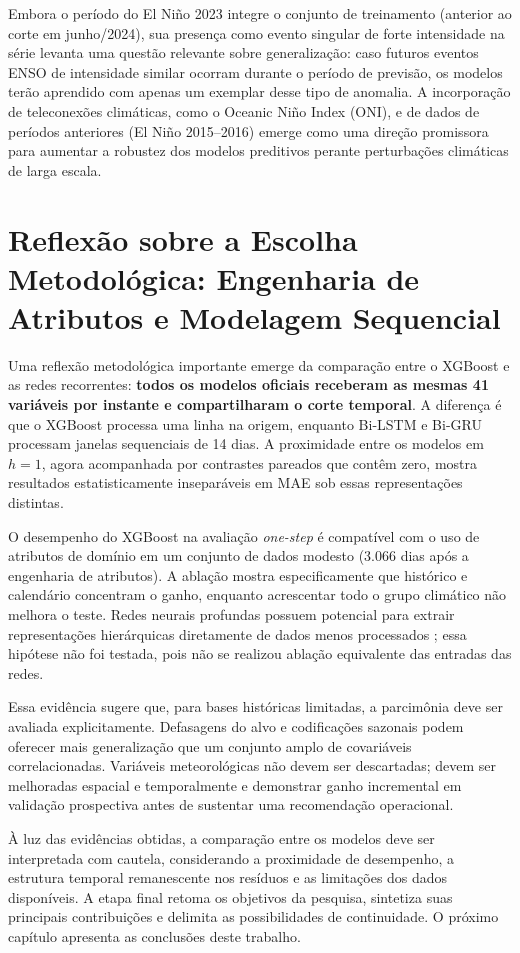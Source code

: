 Embora o período do El Niño 2023 integre o conjunto de treinamento (anterior ao corte em junho/2024), sua presença como evento singular de forte intensidade na série levanta uma questão relevante sobre generalização: caso futuros eventos ENSO de intensidade similar ocorram durante o período de previsão, os modelos terão aprendido com apenas um exemplar desse tipo de anomalia. A incorporação de teleconexões climáticas, como o Oceanic Niño Index (ONI), e de dados de períodos anteriores (El Niño 2015--2016) emerge como uma direção promissora para aumentar a robustez dos modelos preditivos perante perturbações climáticas de larga escala.

\section{Reflexão sobre a Escolha Metodológica: Engenharia de Atributos e Modelagem Sequencial}

Uma reflexão metodológica importante emerge da comparação entre o XGBoost e as redes recorrentes: \textbf{todos os modelos oficiais receberam as mesmas 41 variáveis por instante e compartilharam o corte temporal}. A diferença é que o XGBoost processa uma linha na origem, enquanto Bi-LSTM e Bi-GRU processam janelas sequenciais de 14 dias. A proximidade entre os modelos em $h=1$, agora acompanhada por contrastes pareados que contêm zero, mostra resultados estatisticamente inseparáveis em MAE sob essas representações distintas.

O desempenho do XGBoost na avaliação \textit{one-step} é compatível com o uso de atributos de domínio em um conjunto de dados modesto (3.066 dias após a engenharia de atributos). A ablação mostra especificamente que histórico e calendário concentram o ganho, enquanto acrescentar todo o grupo climático não melhora o teste. Redes neurais profundas possuem potencial para extrair representações hierárquicas diretamente de dados menos processados \cite{goodfellow2016deep}; essa hipótese não foi testada, pois não se realizou ablação equivalente das entradas das redes.

Essa evidência sugere que, para bases históricas limitadas, a parcimônia deve ser avaliada explicitamente. Defasagens do alvo e codificações sazonais podem oferecer mais generalização que um conjunto amplo de covariáveis correlacionadas. Variáveis meteorológicas não devem ser descartadas; devem ser melhoradas espacial e temporalmente e demonstrar ganho incremental em validação prospectiva antes de sustentar uma recomendação operacional.

À luz das evidências obtidas, a comparação entre os modelos deve ser interpretada com cautela, considerando a proximidade de desempenho, a estrutura temporal remanescente nos resíduos e as limitações dos dados disponíveis. A etapa final retoma os objetivos da pesquisa, sintetiza suas principais contribuições e delimita as possibilidades de continuidade. O próximo capítulo apresenta as conclusões deste trabalho.
